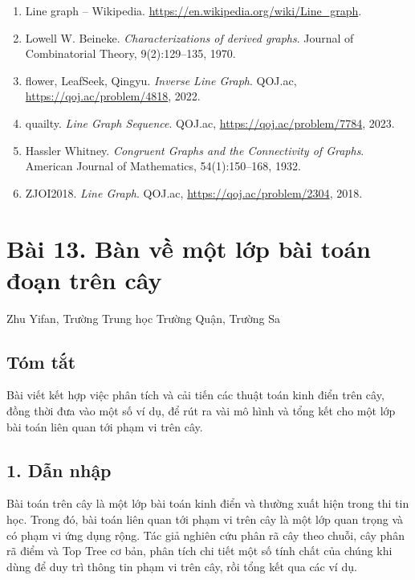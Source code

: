 \documentclass[11pt]{article}
\begin{document}
\begin{enumerate}
  \item Line graph -- Wikipedia.
  \url{https://en.wikipedia.org/wiki/Line_graph}.
  \item Lowell W. Beineke. \emph{Characterizations of derived graphs}. Journal
  of Combinatorial Theory, 9(2):129--135, 1970.
  \item flower, LeafSeek, Qingyu. \emph{Inverse Line Graph}. QOJ.ac,
  \url{https://qoj.ac/problem/4818}, 2022.
  \item quailty. \emph{Line Graph Sequence}. QOJ.ac,
  \url{https://qoj.ac/problem/7784}, 2023.
  \item Hassler Whitney. \emph{Congruent Graphs and the Connectivity of
  Graphs}. American Journal of Mathematics, 54(1):150--168, 1932.
  \item ZJOI2018. \emph{Line Graph}. QOJ.ac,
  \url{https://qoj.ac/problem/2304}, 2018.
\end{enumerate}

\section*{Bài 13. Bàn về một lớp bài toán đoạn trên cây}

\begin{center}
Zhu Yifan, Trường Trung học Trường Quận, Trường Sa
\end{center}

\subsection*{Tóm tắt}

Bài viết kết hợp việc phân tích và cải tiến các thuật toán kinh điển trên cây,
đồng thời đưa vào một số ví dụ, để rút ra vài mô hình và tổng kết cho một lớp
bài toán liên quan tới phạm vi trên cây.

\subsection*{1. Dẫn nhập}

Bài toán trên cây là một lớp bài toán kinh điển và thường xuất hiện trong thi
tin học. Trong đó, bài toán liên quan tới phạm vi trên cây là một lớp quan
trọng và có phạm vi ứng dụng rộng. Tác giả nghiên cứu phân rã cây theo chuỗi,
cây phân rã điểm và Top Tree cơ bản, phân tích chi tiết một số tính chất của
chúng khi dùng để duy trì thông tin phạm vi trên cây, rồi tổng kết qua các ví
dụ.
\end{document}
